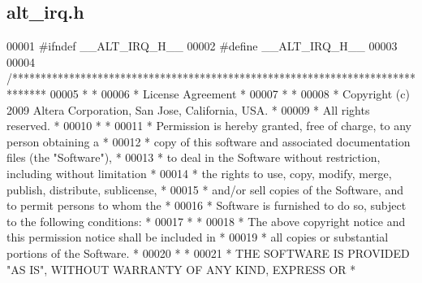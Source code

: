 \subsection{alt\+\_\+irq.\+h}
\label{alt__irq_8h_source}

\begin{DoxyCode}
00001 \textcolor{preprocessor}{#ifndef \_\_ALT\_IRQ\_H\_\_}
00002 \textcolor{preprocessor}{#define \_\_ALT\_IRQ\_H\_\_}
00003 
00004 \textcolor{comment}{/******************************************************************************}
00005 \textcolor{comment}{*                                                                             *}
00006 \textcolor{comment}{* License Agreement                                                           *}
00007 \textcolor{comment}{*                                                                             *}
00008 \textcolor{comment}{* Copyright (c) 2009 Altera Corporation, San Jose, California, USA.           *}
00009 \textcolor{comment}{* All rights reserved.                                                        *}
00010 \textcolor{comment}{*                                                                             *}
00011 \textcolor{comment}{* Permission is hereby granted, free of charge, to any person obtaining a     *}
00012 \textcolor{comment}{* copy of this software and associated documentation files (the "Software"),  *}
00013 \textcolor{comment}{* to deal in the Software without restriction, including without limitation   *}
00014 \textcolor{comment}{* the rights to use, copy, modify, merge, publish, distribute, sublicense,    *}
00015 \textcolor{comment}{* and/or sell copies of the Software, and to permit persons to whom the       *}
00016 \textcolor{comment}{* Software is furnished to do so, subject to the following conditions:        *}
00017 \textcolor{comment}{*                                                                             *}
00018 \textcolor{comment}{* The above copyright notice and this permission notice shall be included in  *}
00019 \textcolor{comment}{* all copies or substantial portions of the Software.                         *}
00020 \textcolor{comment}{*                                                                             *}
00021 \textcolor{comment}{* THE SOFTWARE IS PROVIDED "AS IS", WITHOUT WARRANTY OF ANY KIND, EXPRESS OR  *}

\end{DoxyCode}

